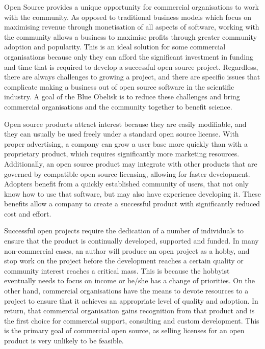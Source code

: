 \documentclass[10pt]{bmc_article}
\newenvironment{bmcformat}{\begin{raggedright}\baselineskip20pt\sloppy\setboolean{publ}{false}}{\end{raggedright}\baselineskip20pt\sloppy}
\begin{document}
\begin{bmcformat}
Open Source provides a unique opportunity for commercial organisations to work with the community. As opposed to traditional business models which focus on maximising revenue through monetisation of all aspects of software, working with the community allows a business to maximise profits through greater community adoption and popularity. This is an ideal solution for some commercial organisations because only they can afford the significant investment in funding and time that is required to develop a successful open source project. Regardless, there are always challenges to growing a project, and there are specific issues that complicate making a business out of open source software in the scientific industry. A goal of the Blue Obelisk is to reduce these challenges and bring commercial organisations and the community together to benefit science.

Open source products attract interest because they are easily modifiable, and they can usually be used freely under a standard open source license. With proper advertising, a company can grow a user base more quickly than with a proprietary product, which requires significantly more marketing resources. Additionally, an open source product may integrate with other products that are governed by compatible open source licensing, allowing for faster development. Adopters benefit from a quickly established community of users, that not only know how to use that software, but may also have experience developing it. These benefits allow a company to create a successful product with significantly reduced cost and effort.

Successful open projects require the dedication of a number of individuals to ensure that the product is continually developed, supported and funded. In many non-commercial cases, an author will produce an open project as a hobby, and stop work on the project before the development reaches a certain quality or community interest reaches a critical mass. This is because the hobbyist eventually needs to focus on income or he/she has a change of priorities. On the other hand, commercial organisations have the means to devote resources to a project to ensure that it achieves an appropriate level of quality and adoption. In return, that commercial organisation gains recognition from that product and is the first choice for commercial support, consulting and custom development. This is the primary goal of commercial open source, as selling licenses for an open product is very unlikely to be feasible.


\end{bmcformat}
\end{document}
